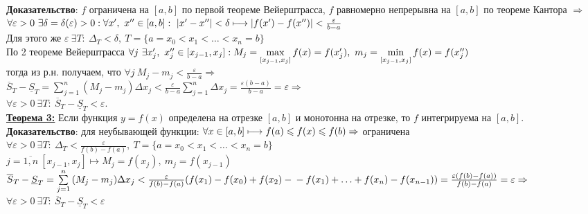 \documentclass[a4paper,12pt]{article} %
\renewcommand {\leq}{\leqslant}
\begin{document}
	\textbf{Доказательство}: $f$ ограничена на $[a,b]$ по первой теореме Вейерштрасса, $f$ равномерно непрерывна на $[a,b]$ по теореме Кантора $\Rightarrow$\\
	$\forall\varepsilon>0~\exists\delta=\delta(\varepsilon)>0: \forall x^{\prime},~x^{\prime\prime} \in [a,b]:~|x^{\prime}-x^{\prime\prime}|<\delta \longmapsto\\|f(x^{\prime})-f(x^{\prime\prime})|<\frac{\varepsilon}{b-a}$\\
	Для этого же $\varepsilon~\exists T:~\Delta_T<\delta,~T=\{a=x_0<x_1<{\dots}<x_n=b\}$\\
	По 2 теореме Вейерштрасса $\forall j~\exists x^{\prime}_j,~x^{\prime\prime}_j\in [x_{j-1},x_j]:~\\
	M_j=\max\limits_{[x_{j-1},x_j]}{f(x)}=f(x^{\prime}_j),~m_j=\min\limits_{[x_{j-1},x_j]}{f(x)}=f(x^{\prime\prime}_j)$\\
	тогда из р.н. получаем, что $\forall j~M_j-m_j<\frac{\varepsilon}{b-a}\Rightarrow$\\
	$\overline{S}_T-\underline{S}_T=\sum\limits^{n}_{j=1}{(M_j-m_j)\Delta x_j}<\frac{\varepsilon}{b-a}\sum\limits^{n}_{j=1}{\Delta x_j}=\frac{\varepsilon(b-a)}{b-a}=\varepsilon\Rightarrow$\\
	$\forall\varepsilon>0~\exists T:~\overline{S}_T-\underline{S}_T<\varepsilon$.\\
	
	
	\underline{\textbf{Теорема 3:}} Если функция $y=f(x)$ определена на отрезке $[a,b]$ и монотонна на отрезке, то $f$ интегрируема на $[a,b]$.\\
	
	\textbf{Доказательство}: для неубывающей функции: $\forall x\in[a,b]\longmapsto\\
	f(a)\leq f(x) \leq f(b)\Rightarrow$ ограничена\\
	$\forall\varepsilon>0~\exists T:~\Delta_T<\frac{\varepsilon}{f(b)-f(a)},~T=\{a=x_0<x_1<{\dots}<x_n=b\}$\\
	$j=\overline{1,n}~[x_{j-1},x_j]\longmapsto
	M_j=f(x_j),~m_j=f(x_{j-1})$\\
	$\overline{S}_T-\underline{S}_T=\sum\limits^{n}_{j=1}{(M_j-m_j)\Delta x_j}<\frac{\varepsilon}{f(b)-f(a)}(f(x_1)-f(x_0)+f(x_2)-\\
	-f(x_1)+{\dots}+f(x_n)-f(x_{n-1}))=\frac{\varepsilon(f(b)-f(a))}{f(b)-f(a)}=\varepsilon\Rightarrow$\\
	$\forall\varepsilon>0~\exists T:~\overline{S}_T-\underline{S}_T<\varepsilon$\\
	
\end{document}
